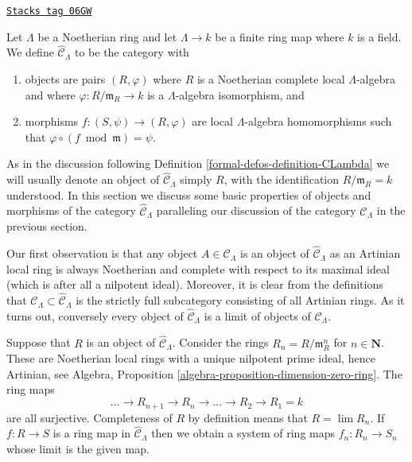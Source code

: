 \begin{definition}
\label{formal-defos-definition-completion-CLambda}
\href{https://stacks.math.columbia.edu/tag/06GW}{\texttt{Stacks tag 06GW}}

Let $\Lambda$ be a Noetherian ring and let $\Lambda \to k$ be a finite
ring map where $k$ is a field. We define {\it $\widehat{\mathcal{C}}_\Lambda$}
to be the category with
\begin{enumerate}
\item objects are pairs $(R, \varphi)$ where $R$ is a Noetherian complete
local $\Lambda$-algebra and where $\varphi : R/\mathfrak m_R \to k$ is a
$\Lambda$-algebra isomorphism, and
\item morphisms $f : (S, \psi) \to (R, \varphi)$ are local $\Lambda$-algebra
homomorphisms such that $\varphi \circ (f \bmod \mathfrak m) = \psi$.
\end{enumerate}
\end{definition}

As in the discussion following
Definition \ref{formal-defos-definition-CLambda}
we will usually denote an object of $\widehat{\mathcal{C}}_\Lambda$
simply $R$, with the identification $R/\mathfrak m_R = k$ understood.
In this section we discuss some basic properties of objects and morphisms
of the category $\widehat{\mathcal{C}}_\Lambda$ paralleling our discussion of
the category $\mathcal{C}_\Lambda$ in the previous section.

\medskip\noindent
Our first observation is that any object $A \in \mathcal{C}_\Lambda$
is an object of $\widehat{\mathcal{C}}_\Lambda$ as an Artinian local
ring is always Noetherian and complete with respect to its maximal ideal
(which is after all a nilpotent ideal). Moreover, it is clear from the
definitions that
$\mathcal{C}_\Lambda \subset \widehat{\mathcal{C}}_\Lambda$
is the strictly full subcategory consisting of all Artinian rings.
As it turns out, conversely every object of
$\widehat{\mathcal{C}}_\Lambda$ is a limit of objects of
$\mathcal{C}_\Lambda$.

\medskip\noindent
Suppose that $R$ is an object of $\widehat{\mathcal{C}}_\Lambda$.
Consider the rings $R_n = R/\mathfrak m_R^n$ for $n \in \mathbf{N}$.
These are Noetherian local rings with a unique nilpotent prime ideal, hence
Artinian, see
Algebra, Proposition \ref{algebra-proposition-dimension-zero-ring}.
The ring maps
$$
\ldots \to R_{n + 1} \to R_n \to \ldots \to R_2 \to R_1 = k
$$
are all surjective. Completeness of $R$ by definition means
that $R = \lim R_n$. If $f : R \to S$ is a ring map in
$\widehat{\mathcal{C}}_\Lambda$ then we obtain a system of ring maps
$f_n : R_n \to S_n$ whose limit is the given map.

